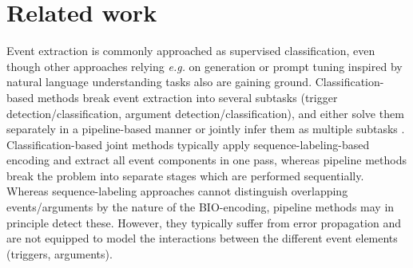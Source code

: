 \documentclass[11pt]{article}
\begin{document}
\section{Related work}
\label{sec:related}

Event extraction is commonly approached as supervised classification, even though other approaches relying \textit{e.g.} on generation \citep{paolini2021structured, lu-etal-2021-text2event, li-etal-2021-document, hsu2022degree} or prompt tuning inspired by natural language understanding tasks \citep{shin-etal-2020-autoprompt,gao-etal-2021-making,li-liang-2021-prefix,liu-etal-2022-dynamic} also are gaining ground. 
Classification-based methods break event extraction into several subtasks (trigger detection/classification, argument detection/classification), and either solve them separately in a pipeline-based manner \citep{ji-grishman-2008-refining, li-etal-2013-joint, liu-etal-2020-event, du-cardie-2020-event, li-etal-2020-event} or jointly infer them as multiple subtasks \citep{yang-mitchell-2016-joint, nguyen-etal-2016-joint-event, liu-etal-2018-jointly, wadden-etal-2019-entity, lin-etal-2020-joint}. Classification-based joint methods typically apply sequence-labeling-based encoding and extract all event components in one pass, whereas pipeline methods break the problem into separate stages which are performed sequentially. Whereas sequence-labeling approaches cannot distinguish overlapping events/arguments by the nature of the BIO-encoding, pipeline methods may in principle detect these. However, they typically suffer from error propagation and are not equipped to model the interactions between the different event elements (triggers, arguments).
\end{document}
